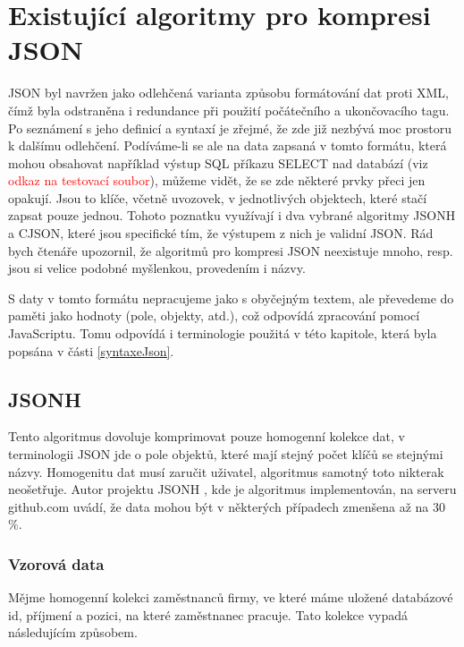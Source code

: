 \chapter{Existující algoritmy pro kompresi JSON}
\label{kapitolaJsonAlgoritmy}

JSON byl navržen jako odlehčená varianta způsobu formátování dat proti XML, čímž byla odstraněna i redundance při použití počátečního a ukončovacího tagu. Po seznámení s jeho definicí a syntaxí je zřejmé, že zde již nezbývá moc prostoru k dalšímu odlehčení. Podíváme-li se ale na data zapsaná v tomto formátu, která mohou obsahovat například výstup SQL příkazu SELECT nad databází (viz \textcolor{red}{odkaz na testovací soubor}), můžeme vidět, že se zde některé prvky přeci jen opakují. Jsou to klíče, včetně uvozovek, v jednotlivých objektech, které stačí zapsat pouze jednou. Tohoto poznatku využívají i dva vybrané algoritmy JSONH a CJSON, které jsou specifické tím, že výstupem z nich je validní JSON. Rád bych čtenáře upozornil, že algoritmů pro kompresi JSON neexistuje mnoho, resp. jsou si velice podobné myšlenkou, provedením i názvy.

S daty v tomto formátu nepracujeme jako s obyčejným textem, ale převedeme do paměti jako hodnoty (pole, objekty, atd.), což odpovídá zpracování pomocí JavaScriptu. Tomu odpovídá i terminologie použitá v této kapitole, která byla popsána v části \ref{syntaxeJson}.

\section{JSONH}
Tento algoritmus dovoluje komprimovat pouze homogenní kolekce dat, v terminologii JSON jde o pole objektů, které mají stejný počet klíčů se stejnými názvy. Homogenitu dat musí zaručit uživatel, algoritmus samotný toto nikterak neošetřuje. Autor projektu JSONH \cite{jsonh}, kde je algoritmus implementován, na serveru github.com uvádí, že data mohou být v některých případech zmenšena až na 30 \%.

\subsection{Vzorová data}
Mějme homogenní kolekci zaměstnanců firmy, ve které máme uložené databázové id, příjmení a pozici, na které zaměstnanec pracuje. Tato kolekce vypadá následujícím způsobem.

